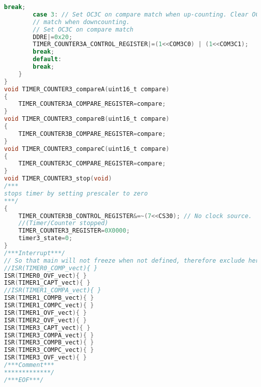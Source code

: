 \begin{lstlisting}[language=C]
		break;
		case 3: // Set OC3C on compare match when up-counting. Clear OC0 on compare
		// match when downcounting.
		// Set OC3C on compare match
		DDRE|=0x20;
		TIMER_COUNTER3A_CONTROL_REGISTER|=(1<<COM3C0) | (1<<COM3C1);
		break;
		default:
		break;
	}
}
void TIMER_COUNTER3_compareA(uint16_t compare)
{
	TIMER_COUNTER3A_COMPARE_REGISTER=compare;
}
void TIMER_COUNTER3_compareB(uint16_t compare)
{
	TIMER_COUNTER3B_COMPARE_REGISTER=compare;
}
void TIMER_COUNTER3_compareC(uint16_t compare)
{
	TIMER_COUNTER3C_COMPARE_REGISTER=compare;
}
void TIMER_COUNTER3_stop(void)
/***
stops timer by setting prescaler to zero
***/
{
	TIMER_COUNTER3B_CONTROL_REGISTER&=~(7<<CS30); // No clock source.
	//(Timer/Counter stopped)
	TIMER_COUNTER3_REGISTER=0X0000;
	timer3_state=0;
}
/***Interrupt***/
// So that main will not freeze when not defined, therefore exclude here! before use.
//ISR(TIMER0_COMP_vect){ }
ISR(TIMER0_OVF_vect){ }
ISR(TIMER1_CAPT_vect){ }
//ISR(TIMER1_COMPA_vect){ }
ISR(TIMER1_COMPB_vect){ }
ISR(TIMER1_COMPC_vect){ }
ISR(TIMER1_OVF_vect){ }
ISR(TIMER2_OVF_vect){ }
ISR(TIMER3_CAPT_vect){ }
ISR(TIMER3_COMPA_vect){ }
ISR(TIMER3_COMPB_vect){ }
ISR(TIMER3_COMPC_vect){ }
ISR(TIMER3_OVF_vect){ }
/***Comment***
*************/
/***EOF***/
\end{lstlisting}
